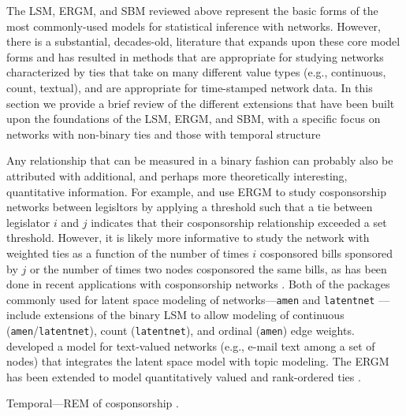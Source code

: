 \documentclass[fleqn,12pt]{wlscirep}
\begin{document}
The LSM, ERGM, and SBM reviewed above represent the basic forms of the most commonly-used models for statistical inference with networks. However, there is a substantial, decades-old, literature that expands upon these core model forms and has resulted in methods that are appropriate for studying networks characterized by ties that take on many different value types (e.g., continuous, count, textual), and are appropriate for time-stamped network data. In this section we provide a brief review of the different extensions that have been built upon the foundations of the LSM, ERGM, and SBM, with a specific focus on networks with non-binary ties and those with temporal structure

Any relationship that can be measured in a binary fashion can probably also be attributed with additional, and perhaps more theoretically interesting, quantitative information. For example, \citet{cranmer2011inferential} and \citet{baller2017specialists}  use ERGM to study cosponsorship networks between legisltors by applying a threshold such that a tie between legislator $i$ and $j$ indicates that their cosponsorship relationship exceeded a set threshold. However, it is likely more informative to study the network with weighted ties as a function of the number of times $i$ cosponsored bills sponsored by $j$ or the number of times two nodes cosponsored the same bills, as has been done in recent applications with cosponsorship networks \citep[e.g., ][]{kirkland2012multimember,signorelli2018penalized}. Both of the \R packages commonly used for latent space modeling of networks---\texttt{amen} \citep{amen} and \texttt{latentnet} \citep{latentnet}---include extensions of the binary LSM to allow modeling of continuous (\texttt{amen}/\texttt{latentnet}), count (\texttt{latentnet}), and ordinal (\texttt{amen}) edge weights. \cite{krafft2012topic} developed a model for text-valued networks (e.g., e-mail text among a set of nodes) that integrates the latent space model with topic modeling. The ERGM has been extended to model quantitatively valued and rank-ordered ties \citep{wyatt2009dynamic, krivitsky2012exponential,desmarais2012statistical, krivitsky2017exponential}. 


Temporal---REM of cosponsorship \citep{brandenberger2018trading}. 
\end{document}
